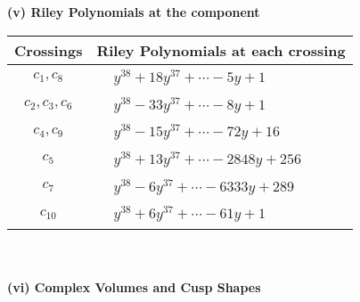 \documentclass[1p]{elsarticle_modified}
\theoremstyle{definition}
\begin{document}
\newpage\renewcommand{\arraystretch}{1}
\flushleft \textbf{(v) Riley Polynomials at the component}\newline \\
\begin{tabular}{m{50pt}|m{274pt}}
Crossings & \hspace{64pt}Riley Polynomials at each crossing \\
\hline $$\begin{aligned}c_{1},c_{8}\end{aligned}$$&$\begin{aligned}
&y^{38}+18 y^{37}+\cdots-5 y+1
\end{aligned}$\\
\hline $$\begin{aligned}c_{2},c_{3},c_{6}\end{aligned}$$&$\begin{aligned}
&y^{38}-33 y^{37}+\cdots-8 y+1
\end{aligned}$\\
\hline $$\begin{aligned}c_{4},c_{9}\end{aligned}$$&$\begin{aligned}
&y^{38}-15 y^{37}+\cdots-72 y+16
\end{aligned}$\\
\hline $$\begin{aligned}c_{5}\end{aligned}$$&$\begin{aligned}
&y^{38}+13 y^{37}+\cdots-2848 y+256
\end{aligned}$\\
\hline $$\begin{aligned}c_{7}\end{aligned}$$&$\begin{aligned}
&y^{38}-6 y^{37}+\cdots-6333 y+289
\end{aligned}$\\
\hline $$\begin{aligned}c_{10}\end{aligned}$$&$\begin{aligned}
&y^{38}+6 y^{37}+\cdots-61 y+1
\end{aligned}$\\
\hline
\end{tabular}\\~\\
\newpage\flushleft \textbf{(vi) Complex Volumes and Cusp Shapes}
\end{document}
